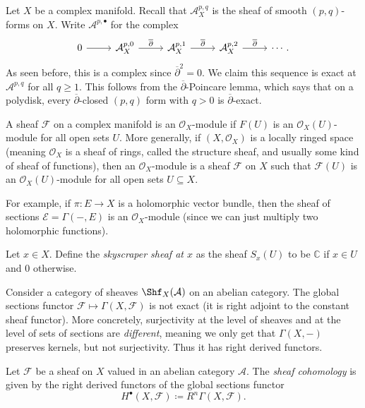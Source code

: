 \begin{example}\label{4.1.7}
	Let $X$ be a complex manifold. Recall that $\mathcal{A} ^{p,q}_X$ is the sheaf of smooth $(p,q)$-forms on $X$. Write $\mathcal{A} ^{p,\bullet} $ for the complex
	\[\begin{tikzcd}[row sep = 2.5em, column sep = 2.5em]
	0\ar[r]  & \mathcal{A} ^{p,0}_X \ar[" \overline{\partial }  ", r]  & \mathcal{A} ^{p,1}_X \ar[" \overline{\partial }  ", r]  & \mathcal{A} ^{p,2}_X \ar[" \overline{\partial }  ", r]  & \cdots .
	\end{tikzcd}\]
	As seen before, this is a complex since $\overline{\partial } ^2=0$. We claim this sequence is exact at $\mathcal{A} ^{p,q} $ for all $q\geq 1$. This follows from the $\overline{\partial } $-Poincare lemma, which says that on a polydisk, every $\overline{\partial } $-closed $(p,q)$ form with $q>0$ is $\overline{\partial } $-exact.
\end{example}

\begin{definition}\label{4.1.8}
	A sheaf $\mathcal{F} $ on a complex manifold is an $\mathcal{O} _X$-module if $F(U)$ is an $\mathcal{O} _X(U)$-module for all open sets $U$. More generally, if $(X,\mathcal{O} _X)$ is a locally ringed space (meaning $\mathcal{O} _X$ is a sheaf of rings, called the structure sheaf, and usually some kind of sheaf of functions), then an $\mathcal{O} _X$-module is a sheaf $\mathcal{F} $ on $X$ such that $\mathcal{F} (U)$ is an $\mathcal{O} _X(U)$-module for all open sets $U\subseteq X$.
\end{definition}

\begin{example}\label{4.1.9}
	For example, if $\pi : E \to X$ is a holomorphic vector bundle, then the sheaf of sections $\mathcal{E} =\Gamma (-,E)$ is an $\mathcal{O} _X$-module (since we can just multiply two holomorphic functions).
\end{example}

\begin{example}\label{4.1.10}
	Let $x\in X$. Define the \emph{skyscraper sheaf at $x$} as the sheaf $S_x(U)$ to be $\mathbb{C} $ if $x\in U$ and $0$ otherwise.
\end{example}

Consider a category of sheaves $\Shf _X(\mathcal{A} )$ on an abelian category. The global sections functor $\mathcal{F} \mapsto \Gamma (X,\mathcal{F} )$ is not exact (it is right adjoint to the constant sheaf functor). More concretely, surjectivity at the level of sheaves and at the level of sets of sections are \emph{different}, meaning we only get that $\Gamma (X,-)$ preserves kernels, but not surjectivity. Thus it has right derived functors.

\begin{definition}\label{4.1.11}
	Let $\mathcal{F} $ be a sheaf on $X$ valued in an abelian category $\mathcal{A} $. The \emph{sheaf cohomology} is given by the right derived functors of the global sections functor
	\[
		H^{\bullet} (X,\mathcal{F} )\coloneqq R^n\Gamma (X,\mathcal{F} )
	.\]
\end{definition}

